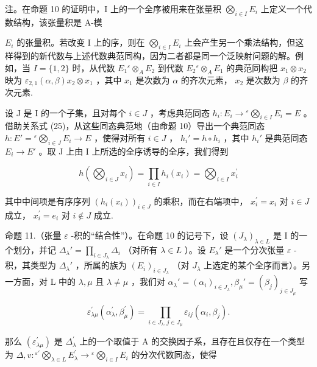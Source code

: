 注。在命题 10 的证明中，I 上的一个全序被用来在张量积 \(\bigotimes_{i\in I}E_i\) 上定义一个代数结构，该张量积是 A-模

\(E_{i}\) 的张量积。若改变 I 上的序，则在 \(\bigotimes_{i\in I}E_{i}\) 上会产生另一个乘法结构，但这样得到的新代数与上述代数典范同构，因为二者都是同一个泛映射问题的解。例如，当 \(I=\{1,2\}\) 时，从代数 \(E_{1}{}^{\varepsilon}\otimes_{A}E_{2}\) 到代数 \(E_{2}{}^{\varepsilon}\otimes_{A}E_{1}\) 的典范同构把 \(x_{1}\otimes x_{2}\) 映为 \(\varepsilon_{2,1}(\alpha,\beta)x_{2}\otimes x_{1}\) ，其中 \(x_{1}\) 是次数为 \(\alpha\) 的齐次元素， \(x_{2}\) 是次数为 \(\beta\) 的齐次元素.

设 J 是 I 的一个子集，且对每个 \(i \in J\) ，考虑典范同态 \(h_{i}: E_{i} \to {}^{\varepsilon}\bigotimes_{i \in I} E_{i} = E\) 。借助关系式 (25)，从这些同态典范地（由命题 10）导出一个典范同态 \(h: E' = {}^{\varepsilon}\bigotimes_{i \in J} E_{i} \to E\) ，使得对所有 \(i \in J\) ， \(h_{i}' = h \circ h_{i}\) ，其中 \(h_{i}'\) 是典范同态 \(E_{i} \to E'\) 。取 J 上由 I 上所选的全序诱导的全序，我们得到

\[
h \left(\bigotimes_ {i \in J} x _ {i}\right) = \prod_ {i \in I} h _ {i} \left(x _ {i}\right) = \bigotimes_ {i \in I} x _ {i} ^ {\prime}
\]

其中中间项是有序序列 \((h_i(x_i))_{i\in J}\) 的乘积，而在右端项中， \(x_{i}^{\prime} = x_{i}\) 对 \(i\in J\) 成立， \(x_{i}^{\prime} = e_{i}\) 对 \(i\notin J\) 成立.

命题 11.（张量 \(\varepsilon\) -积的“结合性”）。在命题 10 的记号下，设 \((J_{\lambda})_{\lambda \in L}\) 是 I 的一个划分，并记 \(\Delta_{\lambda}' = \prod_{i \in J_{\lambda}} \Delta_i\) （对所有 \(\lambda \in L\) ）。设 \(E_{\lambda}'\) 是一个分次张量 \(\varepsilon\) -积，其类型为 \(\Delta_{\lambda}'\) ，所属的族为 \((E_i)_{i \in J_{\lambda}}\) （对 \(J_{\lambda}\) 上选定的某个全序而言）。另一方面，对 L 中的 \(\lambda, \mu\) 且 \(\lambda \neq \mu\) ，我们对 \(\alpha_{\lambda}' = (\alpha_i)_{i \in J_{\lambda}}, \beta_{\mu}' = (\beta_j)_{j \in J_{\mu}}\) 写

\[
\varepsilon_ {\lambda \mu} ^ {\prime} (\alpha _ {\lambda} ^ {\prime}, \beta_ {\mu} ^ {\prime}) = \prod_ {i \in J _ {\lambda}, j \in J _ {\mu}} \varepsilon_ {i j} (\alpha_ {i}, \beta_ {j}).\tag{32}
\]

那么 \((\varepsilon_{\lambda \mu}^{\prime})\) 是 \(\Delta_{\lambda}^{\prime}\) 上的一个取值于 A 的交换因子系，且存在且仅存在一个类型为 \(\Delta, v: {}^{\varepsilon'}\bigotimes_{\lambda \in L} E_{\lambda}^{\prime} \to {}^{\varepsilon}\bigotimes_{i \in I} E_{i}\) 的分次代数同态，使得

